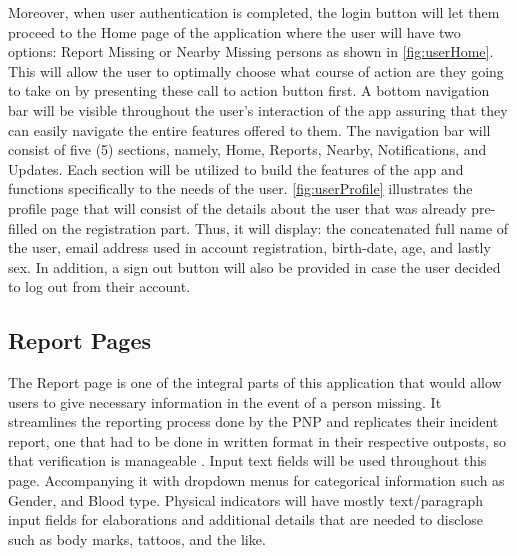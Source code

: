 Moreover, when user authentication is completed, the login button will let them proceed to the Home page of the application where the user will have two options: Report Missing or Nearby Missing persons as shown in \ref{fig:userHome}. This will allow the user to optimally choose what course of action are they going to take on by presenting these call to action button first. A bottom navigation bar will be visible throughout the user’s interaction of the app assuring that they can easily navigate the entire features offered to them. The navigation bar will consist of five (5) sections, namely, Home, Reports, Nearby, Notifications, and Updates. Each section will be utilized to build the features of the app and functions specifically to the needs of the user. \ref{fig:userProfile} illustrates the profile page that will consist of the details about the user that was already pre-filled on the registration part. Thus, it will display: the concatenated full name of the user, email address used in account registration, birth-date, age, and lastly sex. In addition, a sign out button will also be provided in case the user decided to log out from their account.


\subsection{Report Pages}

The Report page is one of the integral parts of this application that would allow users to give necessary information in the event of a person missing. It streamlines the reporting process done by the PNP and replicates their incident report, one that had to be done in written format in their respective outposts, so that verification is manageable \cite{NationalPoliceCommission}. Input text fields will be used throughout this page. Accompanying it with dropdown menus for categorical information such as Gender, and Blood type. Physical indicators will have mostly text/paragraph input fields for elaborations and additional details that are needed to disclose such as body marks, tattoos, and the like.

